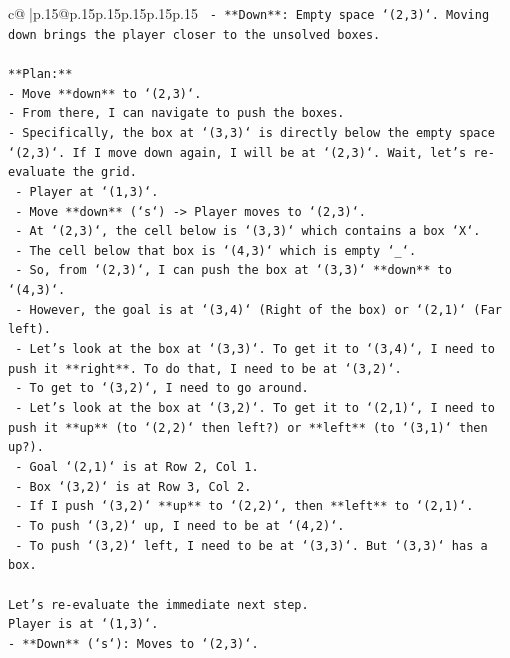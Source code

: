 \documentclass{article}
\begin{document}
{\begin{supertabular}{c@{$\;$}|p{.15\linewidth}@{}p{.15\linewidth}p{.15\linewidth}p{.15\linewidth}p{.15\linewidth}p{.15\linewidth}}
{{{\texttt{   {-} **Down**: Empty space `(2,3)`. Moving down brings the player closer to the unsolved boxes.} \\
\\ 
\texttt{**Plan:**} \\
\texttt{{-} Move **down** to `(2,3)`.} \\
\texttt{{-} From there, I can navigate to push the boxes.} \\
\texttt{{-} Specifically, the box at `(3,3)` is directly below the empty space `(2,3)`. If I move down again, I will be at `(2,3)`. Wait, let's re{-}evaluate the grid.} \\
\texttt{  {-} Player at `(1,3)`.} \\
\texttt{  {-} Move **down** (`s`) {-}> Player moves to `(2,3)`.} \\
\texttt{  {-} At `(2,3)`, the cell below is `(3,3)` which contains a box `X`.} \\
\texttt{  {-} The cell below that box is `(4,3)` which is empty `\_`.} \\
\texttt{  {-} So, from `(2,3)`, I can push the box at `(3,3)` **down** to `(4,3)`.} \\
\texttt{  {-} However, the goal is at `(3,4)` (Right of the box) or `(2,1)` (Far left).} \\
\texttt{  {-} Let's look at the box at `(3,3)`. To get it to `(3,4)`, I need to push it **right**. To do that, I need to be at `(3,2)`.} \\
\texttt{  {-} To get to `(3,2)`, I need to go around.} \\
\texttt{  {-} Let's look at the box at `(3,2)`. To get it to `(2,1)`, I need to push it **up** (to `(2,2)` then left?) or **left** (to `(3,1)` then up?).} \\
\texttt{    {-} Goal `(2,1)` is at Row 2, Col 1.} \\
\texttt{    {-} Box `(3,2)` is at Row 3, Col 2.} \\
\texttt{    {-} If I push `(3,2)` **up** to `(2,2)`, then **left** to `(2,1)`.} \\
\texttt{    {-} To push `(3,2)` up, I need to be at `(4,2)`.} \\
\texttt{    {-} To push `(3,2)` left, I need to be at `(3,3)`. But `(3,3)` has a box.} \\
\\ 
\texttt{Let's re{-}evaluate the immediate next step.} \\
\texttt{Player is at `(1,3)`.} \\
\texttt{{-} **Down** (`s`): Moves to `(2,3)`.} \\
}}}
\end{supertabular}}
\end{document}
